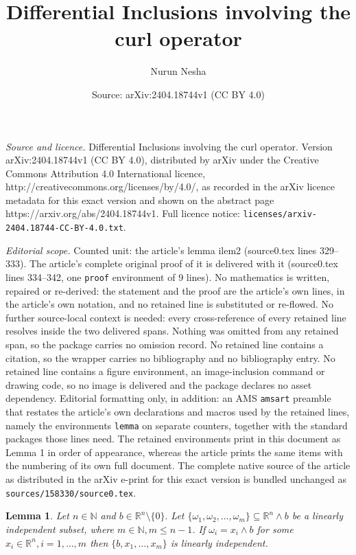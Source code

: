 \documentclass[10pt,a4paper]{amsart}
\title{Differential Inclusions involving the curl operator}
\author{Nurun Nesha}
\date{Source: arXiv:2404.18744v1 (CC BY 4.0)}
\newtheorem{lemma}{Lemma}
\begin{document}
\maketitle

\noindent\emph{Source and licence.} Differential Inclusions involving the curl operator. Version arXiv:2404.18744v1 (CC BY 4.0), distributed by arXiv under the Creative Commons Attribution 4.0 International licence, http://creativecommons.org/licenses/by/4.0/, as recorded in the arXiv licence metadata for this exact version and shown on the abstract page https://arxiv.org/abs/2404.18744v1. Full licence notice: \texttt{licenses/arxiv-2404.18744-CC-BY-4.0.txt}.\par\smallskip

\noindent\textit{Editorial scope.} Counted unit: the article's lemma ilem2 (source0.tex lines 329--333). The article's complete original proof of it is delivered with it (source0.tex lines 334--342, one \texttt{proof} environment of 9 lines). No mathematics is written, repaired or re-derived: the statement and the proof are the article's own lines, in the article's own notation, and no retained line is substituted or re-flowed.  No further source-local context is needed: every cross-reference of every retained line resolves inside the two delivered spans.  Nothing was omitted from any retained span, so the package carries no omission record.  No retained line contains a citation, so the wrapper carries no bibliography and no bibliography entry.  No retained line contains a figure environment, an image-inclusion command or drawing code, so no image is delivered and the package declares no asset dependency.  Editorial formatting only, in addition: an AMS \texttt{amsart} preamble that restates the article's own declarations and macros used by the retained lines, namely the environments \texttt{lemma} on separate counters, together with the standard packages those lines need.  The retained environments print in this document as Lemma 1 in order of appearance, whereas the article prints the same items with the numbering of its own full document.  The complete native source of the article as distributed in the arXiv e-print for this exact version is bundled unchanged as \texttt{sources/158330/source0.tex}.
\begin{lemma}\label{ilem2}
Let $n\in \mathbb N$ and $b\in \mathbb R^n\setminus \{0\}.$ Let $\{\omega_1,\omega_2,\ldots, \omega_m\}\subseteq \mathbb R^n\wedge b$ be a linearly independent subset, where $m\in \mathbb N, m\leq n-1$. If $\omega_i=x_i\wedge b$  for some $x_i\in \mathbb R^n,i=1,\ldots,m$ then $\{b,x_1,\ldots,x_m\}$ is linearly independent.
\end{lemma}
\end{document}
